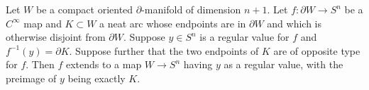 Let $W$ be a compact oriented $\partial$-manifold of dimension $n + 1$. Let $f: \partial W \to S^n$ be a $C^\infty$ map and $K \subset W$ a neat arc whose endpoints are in $\partial W$ and which is otherwise disjoint from $\partial W$. Suppose $y \in S^n$ is a regular value for $f$ and $f^{-1}(y) = \partial K$. Suppose further that the two endpoints of $K$ are of opposite type for $f$. Then $f$ extends to a map $W \to S^n$ having $y$ as a regular value, with the preimage of $y$ being exactly $K$.
